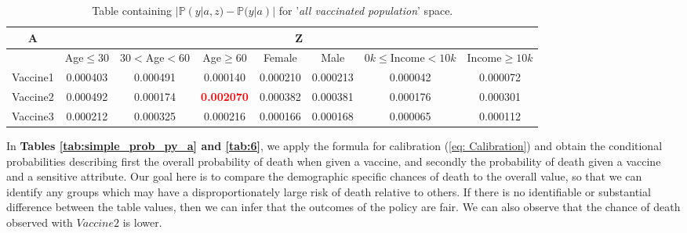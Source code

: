 \documentclass{article}
\begin{document}
\begin{center}
\begin{table}[H]
\begin{adjustbox}{max width=\textwidth}
    \begin{tabular}{ |c| c c c c c c c|}
        \hline
          A  & \multicolumn{7}{c|}{Z} \\
          \hline
          & Age$\leq30$ &    $30<$Age$<60$ &     Age$\geq60$ &    Female &      Male &   $0k\leq$Income$<10k$ &    Income$\geq10k$  \\
        \hline
        Vaccine1 &  0.000403 &  0.000491 &  0.000140 &  0.000210 &  0.000213 &  0.000042 &  0.000072 \\
        Vaccine2 &  0.000492 &  0.000174 &  \textbf{\textcolor{red}{0.002070}} &  0.000382 &  0.000381 &  0.000176 &  0.000301 \\
        Vaccine3 &  0.000212 &  0.000325 &  0.000216 &  0.000166 &  0.000168 &  0.000065 &  0.000112
         \\ \hline
    \end{tabular}
    \end{adjustbox}
    \caption{Table containing $| \mathbb{P}(y | a, z) - \mathbb{P}(y | a) |$ for '\textit{all vaccinated population}' space.}
    \label{tab:diff}
\end{table}
\end{center}

In \textbf{Tables \ref{tab:simple_prob_py_a} and \ref{tab:6}}, we apply the formula for calibration (\ref{eq: Calibration}) and obtain the conditional probabilities describing first the overall probability of death when given a vaccine, and secondly the probability of death given a vaccine and a sensitive attribute. Our goal here is to compare the demographic specific chances of death to the overall value, so that we can identify any groups which may have a disproportionately large risk of death relative to others. If there is no identifiable or substantial difference between the table values, then we can infer that the outcomes of the policy are fair. We can also observe that the chance of death observed with $Vaccine2$ is lower.
\end{document}
